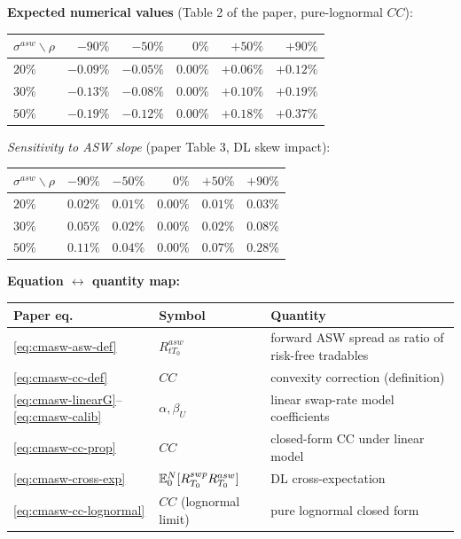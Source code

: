 \documentclass[11pt,a4paper]{article}
\begin{document}
\begin{validation}
\textbf{Expected numerical values} (Table 2 of the paper, pure-lognormal $CC$):

\smallskip
\begin{tabular}{@{}lrrrrr@{}}
\toprule
$\sigma^{asw} \backslash \rho$ & $-90\%$ & $-50\%$ & $0\%$ & $+50\%$ & $+90\%$ \\
\midrule
$20\%$ & $-0.09\%$ & $-0.05\%$ & $0.00\%$ & $+0.06\%$ & $+0.12\%$ \\
$30\%$ & $-0.13\%$ & $-0.08\%$ & $0.00\%$ & $+0.10\%$ & $+0.19\%$ \\
$50\%$ & $-0.19\%$ & $-0.12\%$ & $0.00\%$ & $+0.18\%$ & $+0.37\%$ \\
\bottomrule
\end{tabular}
\smallskip

\textit{Sensitivity to ASW slope} (paper Table 3, DL skew impact):

\smallskip
\begin{tabular}{@{}lrrrrr@{}}
\toprule
$\sigma^{asw} \backslash \rho$ & $-90\%$ & $-50\%$ & $0\%$ & $+50\%$ & $+90\%$ \\
\midrule
$20\%$ & $0.02\%$ & $0.01\%$ & $0.00\%$ & $0.01\%$ & $0.03\%$ \\
$30\%$ & $0.05\%$ & $0.02\%$ & $0.00\%$ & $0.02\%$ & $0.08\%$ \\
$50\%$ & $0.11\%$ & $0.04\%$ & $0.00\%$ & $0.07\%$ & $0.28\%$ \\
\bottomrule
\end{tabular}
\smallskip

\textbf{Equation $\leftrightarrow$ quantity map:}

\smallskip
\begin{tabular}{@{}p{2.8cm}p{3.8cm}p{6.2cm}@{}}
\toprule
Paper eq.                     & Symbol                          & Quantity \\
\midrule
\eqref{eq:cmasw-asw-def}      & $R^{asw}_{t T_0}$               & forward ASW spread as ratio of risk-free tradables \\
\eqref{eq:cmasw-cc-def}       & $CC$                            & convexity correction (definition) \\
\eqref{eq:cmasw-linearG}--\eqref{eq:cmasw-calib} & $\alpha, \beta_U$ & linear swap-rate model coefficients \\
\eqref{eq:cmasw-cc-prop}      & $CC$                            & closed-form CC under linear model \\
\eqref{eq:cmasw-cross-exp}    & $\mathbb{E}^N_0[R^{swp}_{T_0} R^{asw}_{T_0}]$ & DL cross-expectation \\
\eqref{eq:cmasw-cc-lognormal} & $CC$ (lognormal limit)          & pure lognormal closed form \\
\bottomrule
\end{tabular}
\smallskip


\end{validation}
\end{document}
